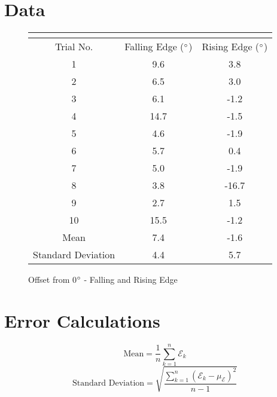 \documentclass[11pt]{article}
\begin{document}
\section{Data}
\begin{figure}[h!t]
\begin{center}
\caption{Offset from 0$\degree$ - Falling and Rising Edge}
\begin{tabular}{| c | c | c |}
\multicolumn{3}{c}{} \\ \hline
\rowcolor{dblue}
Trial No. & Falling Edge ($\degree$) & Rising Edge ($\degree$) \\ \hline
1 & 9.6 & 3.8 \\ \hline
2 & 6.5 & 3.0 \\ \hline
3 & 6.1 & -1.2 \\ \hline
4 & 14.7 & -1.5 \\ \hline
5 & 4.6 & -1.9 \\ \hline
6 & 5.7 & 0.4 \\ \hline
7 & 5.0 & -1.9 \\ \hline
8 & 3.8 & -16.7 \\ \hline
9 & 2.7 & 1.5 \\ \hline
10 & 15.5 & -1.2 \\ \hline
\rowcolor{lyellow}
Mean & 7.4 & -1.6 \\\hline
\rowcolor{lgreen}
Standard Deviation & 4.4 & 5.7 \\ \hline
\end{tabular}
\end{center}
\end{figure}
\section{Error Calculations}
\begin{equation}
	\mbox{Mean} = \frac{1}{n} \sum_{k=1}^{n}\mathcal{E}_k
\end{equation}
\begin{equation}
	\mbox{Standard Deviation} = \sqrt{\frac{\sum_{k=1}^{n}(\mathcal{E}_k-\mu_{\mathcal{E}})^2}{n-1}}
\end{equation}
\end{document}
